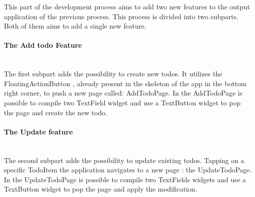 

This part of the development process aims to add two new features to the output application of the previous process. This process is divided into two subparts. Both of them aims to add a single new feature.

\paragraph{The Add todo Feature} \mbox{} \\
\label{par:add_todo_feature}
The first subpart adds the possibility to create new todos. It utilizes the FloatingActionButton , already present in the skeleton of the app in the bottom right corner, to push a new page called: AddTodoPage. In the AddTodoPage is possible to compile two TextField widget and use a TextButton widget to pop the page and create the new todo.
 
 
\paragraph{The Update feature} \mbox{} \\
\label{par:update_todo_feature}
The second subpart adds the possibility to update existing todos. Tapping on a specific TodoItem the application navigates to a new page : the UpdateTodoPage. In the UpdateTodoPage is possible to compile two TextFields widgets and use a TextButton widget to pop the page and apply the modification.